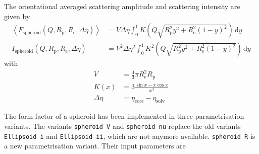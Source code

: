 The orientational averaged scattering amplitude and scattering intensity are given by \cite{Guinier1939}
\begin{align}
\left\langle F_\text{spheroid}(Q,R_\mathrm{p},R_\mathrm{e},\Delta\eta)\right\rangle &= V\Delta\eta
 \int_0^{1}\! K\left(Q\sqrt{R_\mathrm{p}^2y^2+R_\mathrm{e}^2(1-y)^2}\right) \, \mathrm{d}y \\
I_\text{spheroid}(Q,R_\mathrm{p},R_\mathrm{e},\Delta\eta) &=  V^2\Delta\eta^2
 \int_0^{1}\! K^2\left(Q\sqrt{R_\mathrm{p}^2y^2+R_\mathrm{e}^2(1-y)^2}\right) \, \mathrm{d}y
\end{align}
with
\begin{align}
V &= \frac{4}{3}\pi R_\mathrm{e}^2R_\mathrm{p}\\
K(x) &= 3 \frac{\sin x - x \cos x}{x^3}\\
\Delta \eta &= \eta_\mathrm{core}-\eta_\mathrm{solv}
\end{align}

The form factor of a spheroid has been implemented in three parametrisation variants.
The variants \texttt{spheroid V} and \texttt{spheroid nu} replace the old variants \texttt{Ellipsoid i} and \texttt{Ellipsoid ii}, which are not anymore available. \texttt{spheroid R} is a new parametrisation variant. Their input parameters are

